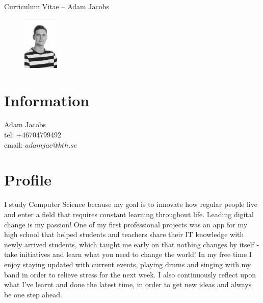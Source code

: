 \documentclass[margin,line,a4paper]{resume}
\begin{document}
{\sc \Large Curriculum Vitae -- Adam Jacobs}
\begin{resume}
    \vspace{0.01cm}
    \begin{figure}
        \vspace{-1cm}
       \begin{center}
       \includegraphics[width=0.15\textwidth]{adamjacobs}
       \end{center}
        \vspace{-1cm}
    \end{figure}
    
    \section{\mysidestyle Information}%
    Adam Jacobs \\
    tel: +46704799492 \\
    email: $adamjac@kth.se$
    \href{} \\

\section{\mysidestyle Profile}\vspace{1mm}
    I study Computer Science because my goal is to innovate how regular people live and enter a field that requires constant learning throughout life. Leading digital change is my passion! One of my first professional projects was an app for my high school that helped students and teachers share their IT knowledge with newly arrived students, which taught me early on that nothing changes by itself - take initiatives and learn what you need to change the world!  
In my free time I enjoy staying updated with current events, playing drums and singing with my band in order to relieve stress for the next week. I also continuously reflect upon what I've learnt and done the latest time, in order to get new ideas and always be one step ahead.


\end{resume}
\end{document}
